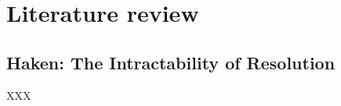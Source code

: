 \documentclass{report}
\begin{document}
\chapter{Literature review}
\label{cha:Literature}

\section{Haken: The Intractability of Resolution}
\label{sec:Haken1985Intractability}

XXX \cite{Haken1985Intractability}




\end{document}
